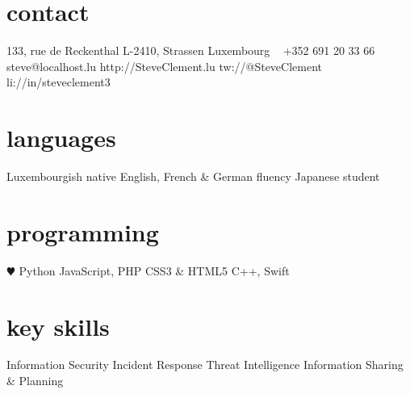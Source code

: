 \documentclass[]{friggeri-cv} %
\begin{document}


\begin{aside} %
\section{contact}
133, rue de Reckenthal
L-2410, Strassen
Luxembourg
~
+352 691 20 33 66
~
{steve@localhost.lu}
{http://SteveClement.lu}
{tw://@SteveClement}
{li://in/steveclement3}
\section{languages}
Luxembourgish native
English, French \& German fluency
Japanese student
\section{programming}
{\color{red} $\varheartsuit$} Python
JavaScript, PHP
CSS3 \& HTML5
C++, Swift
\section{key skills}
Information Security
Incident Response
Threat Intelligence
Information Sharing \& Planning
\end{aside}

\end{document}

